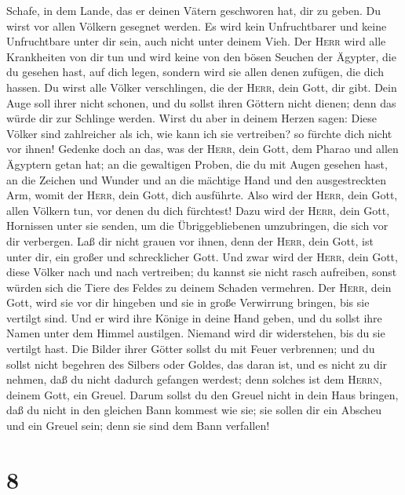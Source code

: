 Schafe, in dem Lande, das er deinen Vätern geschworen hat, dir zu geben.
 Du wirst vor allen Völkern gesegnet werden. Es wird kein
Unfruchtbarer und keine Unfruchtbare unter dir sein, auch nicht unter
deinem Vieh.  Der \textsc{Herr} wird alle Krankheiten von
dir tun und wird keine von den bösen Seuchen der Ägypter, die du gesehen
hast, auf dich legen, sondern wird sie allen denen zufügen, die dich
hassen.  Du wirst alle Völker verschlingen, die der
\textsc{Herr}, dein Gott, dir gibt. Dein Auge soll ihrer nicht schonen,
und du sollst ihren Göttern nicht dienen; denn das würde dir zur
Schlinge werden.  Wirst du aber in deinem Herzen sagen:
Diese Völker sind zahlreicher als ich, wie kann ich sie vertreiben?
 so fürchte dich nicht vor ihnen! Gedenke doch an das,
was der \textsc{Herr}, dein Gott, dem Pharao und allen Ägyptern getan
hat;  an die gewaltigen Proben, die du mit Augen gesehen
hast, an die Zeichen und Wunder und an die mächtige Hand und den
ausgestreckten Arm, womit der \textsc{Herr}, dein Gott, dich ausführte.
Also wird der \textsc{Herr}, dein Gott, allen Völkern tun, vor denen du
dich fürchtest!  Dazu wird der \textsc{Herr}, dein Gott,
Hornissen unter sie senden, um die Übriggebliebenen umzubringen, die
sich vor dir verbergen.  Laß dir nicht grauen vor ihnen,
denn der \textsc{Herr}, dein Gott, ist unter dir, ein großer und
schrecklicher Gott.  Und zwar wird der \textsc{Herr},
dein Gott, diese Völker nach und nach vertreiben; du kannst sie nicht
rasch aufreiben, sonst würden sich die Tiere des Feldes zu deinem
Schaden vermehren.  Der \textsc{Herr}, dein Gott, wird
sie vor dir hingeben und sie in große Verwirrung bringen, bis sie
vertilgt sind.  Und er wird ihre Könige in deine Hand
geben, und du sollst ihre Namen unter dem Himmel austilgen. Niemand wird
dir widerstehen, bis du sie vertilgt hast.  Die Bilder
ihrer Götter sollst du mit Feuer verbrennen; und du sollst nicht
begehren des Silbers oder Goldes, das daran ist, und es nicht zu dir
nehmen, daß du nicht dadurch gefangen werdest; denn solches ist dem
\textsc{Herrn}, deinem Gott, ein Greuel.  Darum sollst du
den Greuel nicht in dein Haus bringen, daß du nicht in den gleichen Bann
kommest wie sie; sie sollen dir ein Abscheu und ein Greuel sein; denn
sie sind dem Bann verfallen!

\hypertarget{section-7}{%
\section{8}\label{section-7}}

